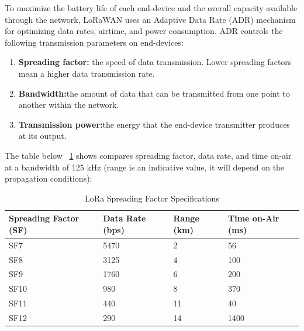 To maximize the battery life of each end-device and the overall capacity available through the network, LoRaWAN uses an Adaptive Data Rate (ADR) mechanism for optimizing data rates, airtime, and power consumption. ADR controls the following transmission parameters on end-devices: \cite{ArduinoLoRaWAN101:2024}

\begin{enumerate}
	\item \textbf{Spreading factor:} the speed of data transmission. Lower spreading factors mean a higher data transmission rate.
	\item \textbf{Bandwidth:}the amount of data that can be transmitted from one point to another within the network.
	\item \textbf{Transmission power:}the energy that the end-device transmitter produces at its output. \cite{ArduinoLoRaWAN101:2024}
\end{enumerate}

The table below ~\ref{tab:spreading-factor-specifications} shows compares spreading factor, data rate, and time on-air at a bandwidth of 125 kHz (range is an indicative value, it will depend on the propagation conditions):

\begin{table}[h!]
	\centering
	\caption{LoRa Spreading Factor Specifications} 
	\begin{tabular}{|l|l|l|l|}
		\hline
		\textbf{Spreading Factor (SF)} & \textbf{Data Rate (bps)} & \textbf{Range (km)} & \textbf{Time on-Air (ms)} \\ \hline
		SF7                            & 5470                    & 2                   & 56                       \\ \hline
		SF8                            & 3125                    & 4                   & 100                      \\ \hline
		SF9                            & 1760                    & 6                   & 200                      \\ \hline
		SF10                           & 980                     & 8                   & 370                      \\ \hline
		SF11                           & 440                     & 11                  & 40                       \\ \hline
		SF12                           & 290                     & 14                  & 1400                     \\ \hline
	\end{tabular}
	\label{tab:spreading-factor-specifications} 
\end{table}

